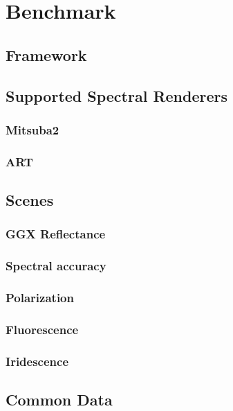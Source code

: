 \chapter{Benchmark}

\section{Framework}

\section{Supported Spectral Renderers}

\subsection{Mitsuba2}

\subsection{ART}

\section{Scenes}

\subsection{GGX Reflectance}

\subsection{Spectral accuracy}

\subsection{Polarization}

\subsection{Fluorescence}

\subsection{Iridescence}

\section{Common Data}

